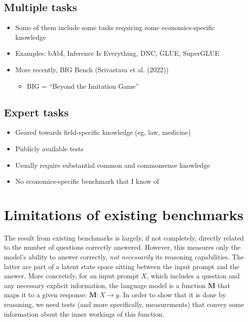 \documentclass[
]{article}
\providecommand{\tightlist}{%
  \setlength{\itemsep}{0pt}\setlength{\parskip}{0pt}}\usepackage{longtable,booktabs,array}
\theoremstyle{plain}
\theoremstyle{definition}
\theoremstyle{remark}
\begin{document}
\subsection{Multiple tasks}\label{multiple-tasks}

\begin{itemize}
\tightlist
\item
  Some of them include some tasks requiring some economics-specific
  knowledge
\item
  Examples: bAbI, Inference Is Everything, DNC, GLUE, SuperGLUE
\item
  More recently, BIG Bench (Srivastava et al. (2022))

  \begin{itemize}
  \tightlist
  \item
    BIG = ``Beyond the Imitation Game''
  \end{itemize}
\end{itemize}

\subsection{Expert tasks}\label{expert-tasks}

\begin{itemize}
\tightlist
\item
  Geared towards field-specific knowledge (eg, law, medicine)
\item
  Publicly available tests
\item
  Usually require substantial common and commonsense knowledge
\item
  No economics-specific benchmark that I know of
\end{itemize}

\section{Limitations of existing
benchmarks}\label{limitations-of-existing-benchmarks}

The result from existing benchmarks is largely, if not completely,
directly related to the number of questions correctly answered. However,
this measures only the model's ability to answer correctly, \emph{not
necessarily} its reasoning capabilities. The latter are part of a latent
state space sitting between the input prompt and the answer. More
concretely, for an input prompt \(X\), which includes a question and any
necessary explicit information, the language model is a function
\(\mathbf{M}\) that maps it to a given response:
\(\mathbf{M} : X \to y\). In order to show that it is done by reasoning,
we need tests (and more specifically, measurements) that convey some
information about the inner workings of this function.
\end{document}

